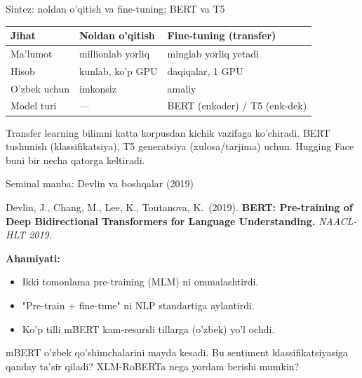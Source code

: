 \documentclass[aspectratio=169,11pt]{beamer}
\begin{document}
\begin{frame}{Sintez: noldan o'qitish va fine-tuning; BERT va T5}
  \begin{center}\small
  \begin{tabular}{p{3.0cm}p{3.6cm}p{4.2cm}}
    \toprule
    \textbf{Jihat} & \textbf{Noldan o'qitish} & \textbf{Fine-tuning (transfer)} \\
    \midrule
    Ma'lumot & millionlab yorliq & minglab yorliq yetadi \\
    Hisob & kunlab, ko'p GPU & daqiqalar, 1 GPU \\
    O'zbek uchun & imkonsiz & amaliy \\
    Model turi & --- & BERT (enkoder) / T5 (enk-dek) \\
    \bottomrule
  \end{tabular}
  \end{center}
  \vspace{4pt}
  \begin{tcolorbox}[okbox,title=Asosiy g'oya,top=2pt,bottom=2pt]
    \footnotesize
    Transfer learning bilimni katta korpusdan kichik vazifaga ko'chiradi. BERT
    tushunish (klassifikatsiya), T5 generatsiya (xulosa/tarjima) uchun.
    Hugging Face buni bir necha qatorga keltiradi.
  \end{tcolorbox}
\end{frame}

\begin{frame}{Seminal manba: Devlin va boshqalar (2019)}
  \begin{tcolorbox}[defbox,title=Manba]
    \small
    Devlin, J., Chang, M., Lee, K., Toutanova, K.\ (2019). \textbf{BERT:
    Pre-training of Deep Bidirectional Transformers for Language Understanding.}
    \textit{NAACL-HLT 2019.}
  \end{tcolorbox}
  \vspace{5pt}
  \textbf{Ahamiyati:}
  \begin{itemize}\small\setlength\itemsep{3pt}
    \item Ikki tomonlama pre-training (MLM) ni ommalashtirdi.
    \item "Pre-train $+$ fine-tune" ni NLP standartiga aylantirdi.
    \item Ko'p tilli mBERT kam-resursli tillarga (o'zbek) yo'l ochdi.
  \end{itemize}
  \vspace{5pt}
  \begin{tcolorbox}[warnbox,title=Muhokama savoli (P13 gacha o'ylang)]
    \small
    mBERT o'zbek qo'shimchalarini mayda kesadi. Bu sentiment klassifikatsiyasiga
    qanday ta'sir qiladi? XLM-RoBERTa nega yordam berishi mumkin?
  \end{tcolorbox}
\end{frame}
\end{document}
